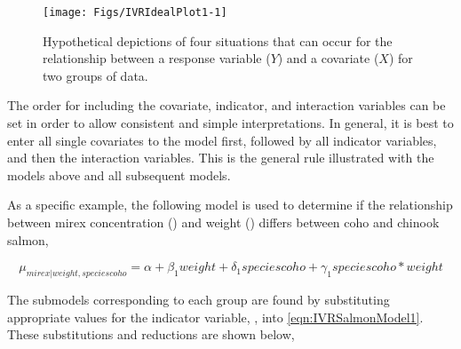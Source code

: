 \documentclass[10pt,openany]{book}\usepackage[]{graphicx}\usepackage[]{color}
\newenvironment{knitrout}{}{} %
\begin{document}
\begin{knitrout}
\color{fgcolor}\begin{figure}[h]

{\centering \texttt{[image: Figs/IVRIdealPlot1-1]} 

}

\caption[Hypothetical depictions of four situations that can occur for the relationship between a response variable (]{Hypothetical depictions of four situations that can occur for the relationship between a response variable ($Y$) and a covariate ($X$) for two groups of data.}\label{fig:IVRIdealPlot1}
\end{figure}


\end{knitrout}

The order for including the covariate, indicator, and interaction variables can be set in order to allow consistent and simple interpretations.  In general, it is best to enter all single covariates to the model first, followed by all indicator variables, and then the interaction variables.  This is the general rule illustrated with the models above and all subsequent models.


As a specific example, the following model is used to determine if the relationship between mirex concentration () and weight () differs between coho and chinook salmon,

\begin{equation} \label{eqn:IVRSalmonModel1}
  \mu_{mirex|weight,speciescoho} = \alpha+\beta_{1}weight+\delta_{1}speciescoho+\gamma_{1}speciescoho*weight
\end{equation}

The submodels corresponding to each group are found by substituting appropriate values for the indicator variable, , into \eqref{eqn:IVRSalmonModel1}.  These substitutions and reductions are shown below,
\end{document}
